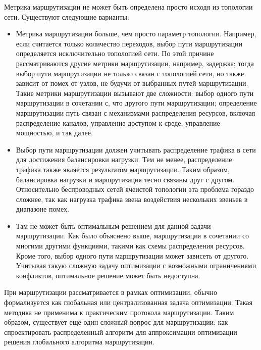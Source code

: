 \documentclass[14pt,a4paper,titlepage]{extarticle}
\begin{document}
Метрика маршрутизации не может быть определена просто исходя из топологии сети. Существуют следующие варианты:
\begin{itemize}
\item Метрика маршрутизации больше, чем просто параметр топологии. Например, если считается только количество переходов, выбор пути маршрутизации определяется исключительно топологией сети. По этой причине рассматриваются другие метрики маршрутизации, например, задержка; тогда выбор пути маршрутизации не только связан с топологией сети, но также зависит от помех от узлов, не будучи от выбранных путей маршрутизации. Такие метрики маршрутизации вызывают две сложности: выбор одного пути маршрутизации в сочетании с, что другого пути маршрутизации;  определение маршрутизации путь связан с механизмами распределения ресурсов, включая распределение каналов, управление доступом к среде, управление мощностью, и так далее.
\item Выбор пути маршрутизации должен учитывать распределение трафика в сети для достижения балансировки нагрузки. Тем не менее, распределение трафика также является результатом маршрутизации. Таким образом, балансировка нагрузки и маршрутизация тесно связаны друг с другом. Относительно беспроводных сетей ячеистой топологии эта проблема гораздо сложнее, так как нагрузка трафика звена воздействия нескольких звеньев в диапазоне помех.
\item Там не может быть оптимальным решением для данной задачи маршрутизации. Как было объяснено выше, маршрутизация в сочетании со многими другими функциями, такими как схемы распределения ресурсов. Кроме того, выбор одного пути маршрутизации может зависеть от другого. Учитывая такую сложную задачу оптимизации с возможными ограничениями конфликтов, оптимальное решение может быть недоступна.
\end{itemize}

При маршрутизации рассматривается в рамках оптимизации, обычно формализуется как глобальная или централизованная задача оптимизации. Такая методика не применима к практическим протокола маршрутизации. Таким образом, существует еще один сложный вопрос для маршрутизации: как спроектировать распределенный алгоритм для аппроксимации оптимизации решения глобального алгоритма маршрутизации.
\end{document}
